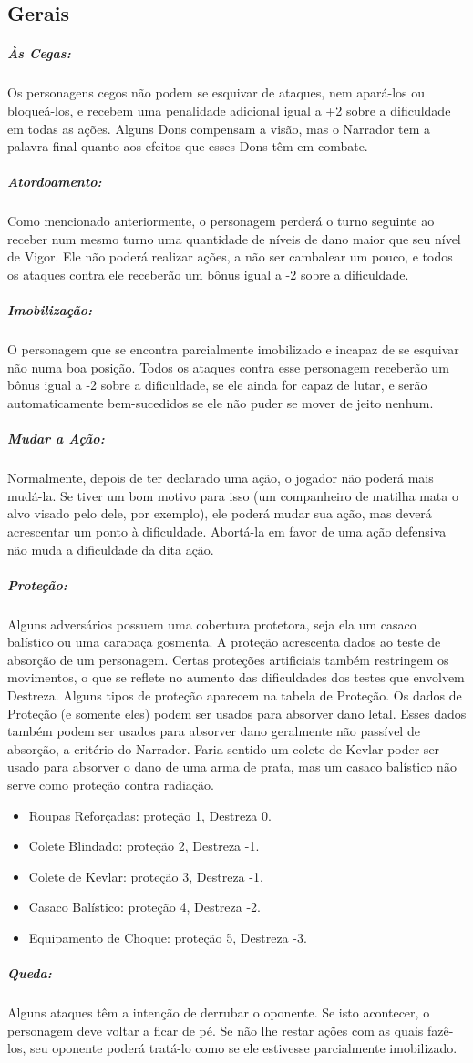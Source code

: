 
\subsection{\bf Gerais}

\subparagraph{\bf Às Cegas:}
Os personagens cegos não podem se esquivar de ataques, nem apará-los ou bloqueá-los, e recebem uma penalidade adicional igual a +2 sobre a dificuldade em todas as ações. Alguns Dons compensam a visão, mas o Narrador tem a palavra final quanto aos efeitos que esses Dons têm em combate.

\subparagraph{\bf Atordoamento:}
Como mencionado anteriormente, o personagem perderá o turno seguinte ao receber num mesmo turno uma quantidade de níveis de dano maior que seu nível de Vigor. Ele não poderá realizar ações, a não ser cambalear um pouco, e todos os ataques contra ele receberão um bônus igual a -2 sobre a dificuldade.

\subparagraph{\bf Imobilização:}
O personagem que se encontra parcialmente imobilizado e incapaz de se esquivar não numa boa posição. Todos os ataques contra esse personagem receberão um bônus igual a -2 sobre a dificuldade, se ele ainda for capaz de lutar, e serão automaticamente bem-sucedidos se ele não puder se mover de jeito nenhum.

\subparagraph{\bf Mudar a Ação:}
Normalmente, depois de ter declarado uma ação, o jogador não poderá mais mudá-la. Se tiver um bom motivo para isso (um companheiro de matilha mata o alvo visado pelo dele, por exemplo), ele poderá mudar sua ação, mas deverá acrescentar um ponto à dificuldade. Abortá-la em favor de uma ação defensiva não muda a dificuldade da dita ação.

\subparagraph{\bf Proteção:}
Alguns adversários possuem uma cobertura protetora, seja ela um casaco balístico ou uma carapaça gosmenta. A proteção acrescenta dados ao teste de absorção de um personagem. Certas proteções artificiais também restringem os movimentos, o que se reflete no aumento das dificuldades dos testes que envolvem Destreza. Alguns tipos de proteção aparecem na tabela de Proteção. Os dados de Proteção (e somente eles) podem ser usados para absorver dano letal. Esses dados também podem ser usados para absorver dano geralmente não passível de absorção, a critério do Narrador. Faria sentido um colete de Kevlar poder ser usado para absorver o dano de uma arma de prata, mas um casaco balístico não serve como proteção contra radiação.
\begin{itemize}[noitemsep]
\item Roupas Reforçadas: proteção 1, Destreza 0.
\item Colete Blindado: proteção 2, Destreza -1.
\item Colete de Kevlar: proteção 3, Destreza -1.
\item Casaco Balístico: proteção 4, Destreza -2.
\item Equipamento de Choque: proteção 5, Destreza -3.
\end{itemize}

\subparagraph{\bf Queda:}
Alguns ataques têm a intenção de derrubar o oponente. Se isto acontecer, o personagem deve voltar a ficar de pé. Se não lhe restar ações com as quais fazê-los, seu oponente poderá tratá-lo como se ele estivesse parcialmente imobilizado.